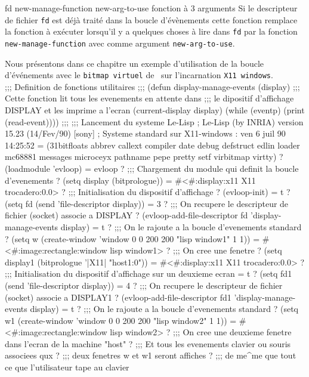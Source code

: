  {fd new-manage-function new-arg-to-use} {fonction \`{a} 3 arguments}
Si le descripteur de fichier {\tt fd} est d\'{e}j\`{a} trait\'{e} dans la boucle
d'\'{e}v\`{e}nements cette fonction remplace la fonction \`{a} ex\'{e}cuter 
lorsqu'il y a quelques choses \`{a} lire dans {\tt fd} par la fonction
{\tt new-manage-function} avec comme argument {\tt new-arg-to-use}.

Nous pr\'{e}sentons dans ce chapitre un exemple d'utilisation de la
boucle d'\'{e}v\'{e}nements avec le {\tt bitmap virtuel} de \LeLisp\ sur
l'incarnation {\tt X11 windows}.\\
\BeginLL
;;; Definition de fonctions utilitaires
;;;
(defun display-manage-events (display)
;;; Cette fonction lit tous les evenements en attente dans 
;;; le dipositif d'affichage DISPLAY et les imprime a l'ecran
        (current-display display)
        (while (eventp) (print (read-event))))
;;;
;;; Lancement du systeme Le-Lisp
; Le-Lisp (by INRIA) version 15.23 (14/Fev/90)   [sony]
; Systeme standard sur X11-windows : ven  6 juil 90 14:25:52 
= (31bitfloats abbrev callext compiler date debug defstruct edlin loader 
mc68881 messages microceyx pathname pepe pretty setf virbitmap virtty)
? (loadmodule 'evloop)
= evloop
? ;;; Chargement du module qui definit la boucle d'evenements
?  (setq display (bitprologue))
= #<#:display:x11 X11 trocadero:0.0>
? ;;; Initialisation du dispositif d'affichage
? (evloop-init)
= t
? (setq fd (send 'file-descriptor display))
= 3
? ;;; On recupere le descripteur de fichier (socket) associe a DISPLAY
? (evloop-add-file-descriptor fd 'display-manage-events display)
= t
? ;;; On le rajoute a la boucle d'evenements standard
? (setq w (create-window 'window 0 0 200 200 "lisp window1" 1 1))
= #<#:image:rectangle:window lisp window1> 
? ;;; On cree une fenetre
?  (setq display1 (bitprologue '|X11| "host1:0"))
= #<#:display:x11 X11 trocadero:0.0>
? ;;; Initialisation du dispositif d'affichage sur un deuxieme ecran
= t
? (setq fd1 (send 'file-descriptor display))
= 4
? ;;; On recupere le descripteur de fichier (socket) associe a DISPLAY1
? (evloop-add-file-descriptor fd1 'display-manage-events display)
= t
? ;;; On le rajoute a la boucle d'evenements standard
? (setq w1 (create-window 'window 0 0 200 200 "lisp window2" 1 1))
= #<#:image:rectangle:window lisp window2> 
? ;;; On cree une deuxieme fenetre dans l'ecran de la machine "host"
? ;;; Et tous les evenements clavier ou souris associees qux
? ;;; deux fenetres w et w1  seront affiches
? ;;; de me^me que tout ce que l'utilisateur tape au clavier

